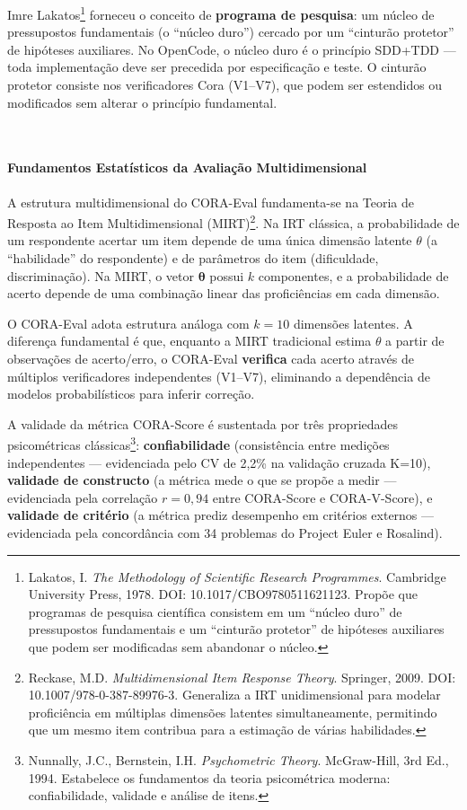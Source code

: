 Imre Lakatos\footnote{Lakatos, I. \textit{The Methodology of Scientific
Research Programmes}. Cambridge University Press, 1978. DOI:
10.1017/CBO9780511621123. Propõe que programas de pesquisa científica
consistem em um ``núcleo duro'' de pressupostos fundamentais e um ``cinturão
protetor'' de hipóteses auxiliares que podem ser modificadas sem abandonar
o núcleo.} forneceu o conceito de \textbf{programa de pesquisa}: um núcleo
de pressupostos fundamentais (o ``núcleo duro'') cercado por um ``cinturão
protetor'' de hipóteses auxiliares. No OpenCode, o núcleo duro é o princípio
SDD+TDD — toda implementação deve ser precedida por especificação e teste.
O cinturão protetor consiste nos verificadores Cora (V1--V7), que podem ser
estendidos ou modificados sem alterar o princípio fundamental.

\\\paragraph{Fundamentos Estatísticos da Avaliação Multidimensional}

A estrutura multidimensional do CORA-Eval fundamenta-se na Teoria de Resposta
ao Item Multidimensional (MIRT)\footnote{Reckase, M.D. \textit{Multidimensional
Item Response Theory}. Springer, 2009. DOI: 10.1007/978-0-387-89976-3.
Generaliza a IRT unidimensional para modelar proficiência em múltiplas
dimensões latentes simultaneamente, permitindo que um mesmo item contribua
para a estimação de várias habilidades.}. Na IRT clássica, a probabilidade
de um respondente acertar um item depende de uma única dimensão latente
$\theta$ (a ``habilidade'' do respondente) e de parâmetros do item
(dificuldade, discriminação). Na MIRT, o vetor $\boldsymbol{\theta}$ possui
$k$ componentes, e a probabilidade de acerto depende de uma combinação
linear das proficiências em cada dimensão.

O CORA-Eval adota estrutura análoga com $k = 10$ dimensões latentes. A
diferença fundamental é que, enquanto a MIRT tradicional estima $\theta$ a
partir de observações de acerto/erro, o CORA-Eval \textbf{verifica} cada
acerto através de múltiplos verificadores independentes (V1--V7), eliminando
a dependência de modelos probabilísticos para inferir correção.

A validade da métrica CORA-Score é sustentada por três propriedades
psicométricas clássicas\footnote{Nunnally, J.C., Bernstein, I.H.
\textit{Psychometric Theory}. McGraw-Hill, 3rd Ed., 1994. Estabelece os
fundamentos da teoria psicométrica moderna: confiabilidade, validade e
análise de itens.}: \textbf{confiabilidade} (consistência entre medições
independentes — evidenciada pelo CV de 2,2\% na validação cruzada K=10),
\textbf{validade de constructo} (a métrica mede o que se propõe a medir —
evidenciada pela correlação $r = 0,94$ entre CORA-Score e CORA-V-Score), e
\textbf{validade de critério} (a métrica prediz desempenho em critérios
externos — evidenciada pela concordância com 34 problemas do Project Euler
e Rosalind).

